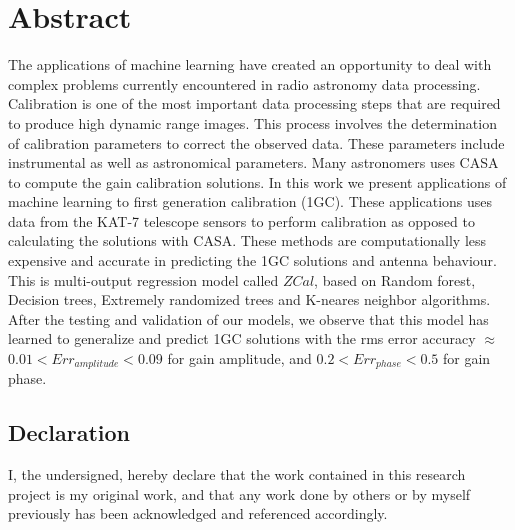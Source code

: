 \chapter*{Abstract} 


The applications of machine learning have created an opportunity to deal with complex problems currently encountered in radio astronomy data processing. Calibration is one of the most important data processing steps that are required to produce high dynamic range images. This process involves the determination of calibration parameters to correct the observed data. These parameters include instrumental as well as astronomical parameters. Many astronomers uses CASA to compute the gain calibration solutions. In this work we present applications of machine learning to first generation calibration (1GC). These applications uses data from the KAT-7 telescope sensors to perform calibration as opposed to calculating the solutions with CASA. These methods are computationally less expensive and accurate in predicting the 1GC solutions and antenna behaviour. This is multi-output regression model called $\textit{ZCal}$, based on Random forest, Decision trees, Extremely randomized trees and K-neares neighbor algorithms. After the testing and validation of our models, we observe that this model has learned to generalize and predict 1GC solutions with the rms error accuracy $\approx$ $0.01<Err_{amplitude}<0.09$ for gain amplitude, and $0.2<Err_{phase}<0.5$ for gain phase.  


\vfill
\section*{Declaration}
I, the undersigned, hereby declare that the work contained in this research project is my original work, and that any work done by others or by myself previously has been acknowledged and referenced accordingly.

